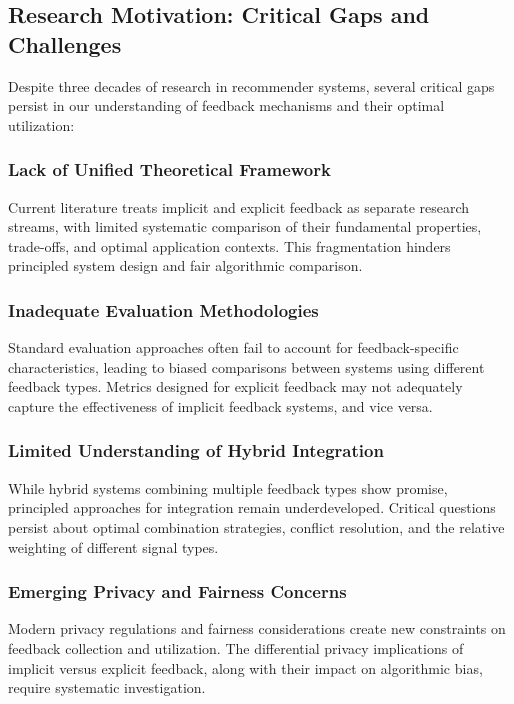 \subsection{Research Motivation: Critical Gaps and Challenges}

Despite three decades of research in recommender systems, several critical gaps persist in our understanding of feedback mechanisms and their optimal utilization:

\subsubsection{Lack of Unified Theoretical Framework}
Current literature treats implicit and explicit feedback as separate research streams, with limited systematic comparison of their fundamental properties, trade-offs, and optimal application contexts. This fragmentation hinders principled system design and fair algorithmic comparison.

\subsubsection{Inadequate Evaluation Methodologies}
Standard evaluation approaches often fail to account for feedback-specific characteristics, leading to biased comparisons between systems using different feedback types. Metrics designed for explicit feedback may not adequately capture the effectiveness of implicit feedback systems, and vice versa.

\subsubsection{Limited Understanding of Hybrid Integration}
While hybrid systems combining multiple feedback types show promise, principled approaches for integration remain underdeveloped. Critical questions persist about optimal combination strategies, conflict resolution, and the relative weighting of different signal types.

\subsubsection{Emerging Privacy and Fairness Concerns}
Modern privacy regulations and fairness considerations create new constraints on feedback collection and utilization. The differential privacy implications of implicit versus explicit feedback, along with their impact on algorithmic bias, require systematic investigation.


